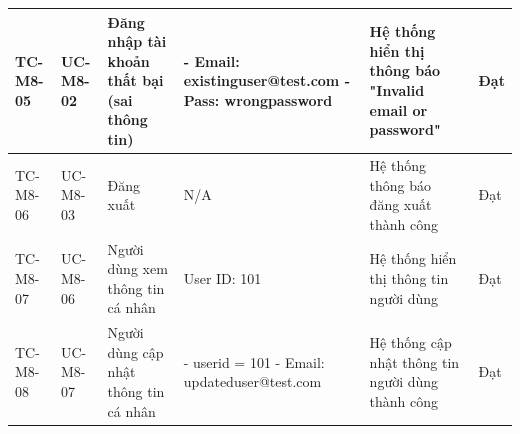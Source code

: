 \begin{landscape}
\begin{longtable}{|p{2.2cm}|p{2.2cm}|p{4cm}|p{4.5cm}|p{6cm}|p{2cm}|}
TC-M8-05 & UC-M8-02 & Đăng nhập tài khoản thất bại (sai thông tin) & 
- Email: existinguser@test.com \newline 
- Pass: wrongpassword & 
Hệ thống hiển thị thông báo "Invalid email or password" & Đạt \\
\hline

TC-M8-06 & UC-M8-03 & Đăng xuất & N/A & 
Hệ thống thông báo đăng xuất thành công & Đạt \\
\hline

TC-M8-07 & UC-M8-06 & Người dùng xem thông tin cá nhân & 
User ID: 101 & 
Hệ thống hiển thị thông tin người dùng & Đạt \\
\hline

TC-M8-08 & UC-M8-07 & Người dùng cập nhật thông tin cá nhân & 
- userid = 101 \newline
- Email: updateduser@test.com & 
Hệ thống cập nhật thông tin người dùng thành công & Đạt \\
\hline


\end{longtable}
\end{landscape}
